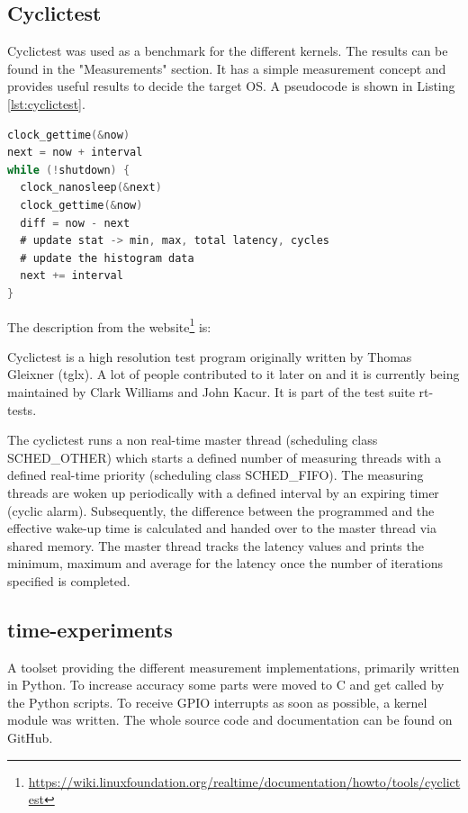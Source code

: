 \subsection{Cyclictest}

Cyclictest was used as a benchmark for the different kernels. The results can be found in the "Measurements" section. It has a simple measurement concept and provides useful results to decide the target OS. A pseudocode is shown in Listing \ref{lst:cyclictest}.

\begin{lstlisting}[label=lst:cyclictest, language=C, caption=Cyclictest pseudocode]
clock_gettime(&now)
next = now + interval
while (!shutdown) {
  clock_nanosleep(&next)
  clock_gettime(&now)
  diff = now - next
  # update stat -> min, max, total latency, cycles
  # update the histogram data
  next += interval
}
\end{lstlisting}

The description from the website\footnote{\url{https://wiki.linuxfoundation.org/realtime/documentation/howto/tools/cyclictest}} is:

\begin{displayquote}
Cyclictest is a high resolution test program originally written by Thomas Gleixner (tglx). A lot of people contributed to it later on and it is currently being maintained by Clark Williams and John Kacur. It is part of the test suite rt-tests.

The cyclictest runs a non real-time master thread (scheduling class SCHED\_OTHER) which starts a defined number of measuring threads with a defined real-time priority (scheduling class SCHED\_FIFO). The measuring threads are woken up periodically with a defined interval by an expiring timer (cyclic alarm). Subsequently, the difference between the programmed and the effective wake-up time is calculated and handed over to the master thread via shared memory. The master thread tracks the latency values and prints the minimum, maximum and average for the latency once the number of iterations specified is completed.
\end{displayquote}

\subsection{time-experiments}

A toolset providing the different measurement implementations, primarily written in Python. To increase accuracy some parts were moved to C and get called by the Python scripts. To receive GPIO interrupts as soon as possible, a kernel module was written. The whole source code and documentation can be found on GitHub.

